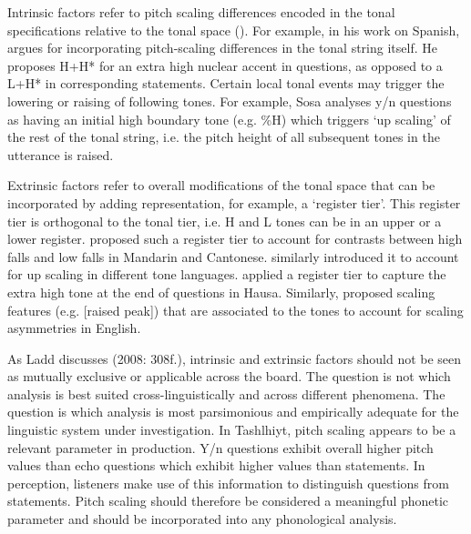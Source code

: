 Intrinsic factors refer to pitch scaling differences encoded in the tonal specifications relative to the tonal space (\citealt{BeckmanPierr1986,Sosa1999}). For example, in his work on Spanish, \citet{Sosa1999} argues for incorporating pitch-scaling differences in the tonal string itself. He proposes H+H* for an extra high nuclear accent in questions, as opposed to a L+H* in corresponding statements. Certain local tonal events may trigger the lowering or raising of following tones. For example, Sosa analyses y/n questions as having an initial high boundary tone (e.g. \%H) which triggers ‘up scaling’ of the rest of the tonal string, i.e. the pitch height of all subsequent tones in the utterance is raised. 

Extrinsic factors refer to overall modifications of the tonal space that can be incorporated by adding representation, for example, a ‘register tier’. This register tier is orthogonal to the tonal tier, i.e. H and L tones can be in an upper or a lower register. \citet{Yip1989} proposed such a register tier to account for contrasts between high falls and low falls in Mandarin and Cantonese. \citet{Snider1999} similarly introduced it to account for up scaling in different tone languages. \citet{InkelasLeben1990} applied a register tier to capture the extra high tone at the end of questions in Hausa. Similarly, \citet{Ladd1983} proposed scaling features (e.g. [raised peak]) that are associated to the tones to account for scaling asymmetries in English. 

As Ladd discusses (2008: 308f.), intrinsic and extrinsic factors should not be seen as mutually exclusive or applicable across the board. The question is not which analysis is best suited cross-linguistically and across different phenomena. The question is which analysis is most parsimonious and empirically adequate for the linguistic system under investigation. In Tashlhiyt, pitch scaling appears to be a relevant parameter in production. Y/n questions exhibit overall higher pitch values than echo questions which exhibit higher values than statements. In perception, listeners make use of this information to distinguish questions from statements. Pitch scaling should therefore be considered a meaningful phonetic parameter and should be incorporated into any phonological analysis. 

